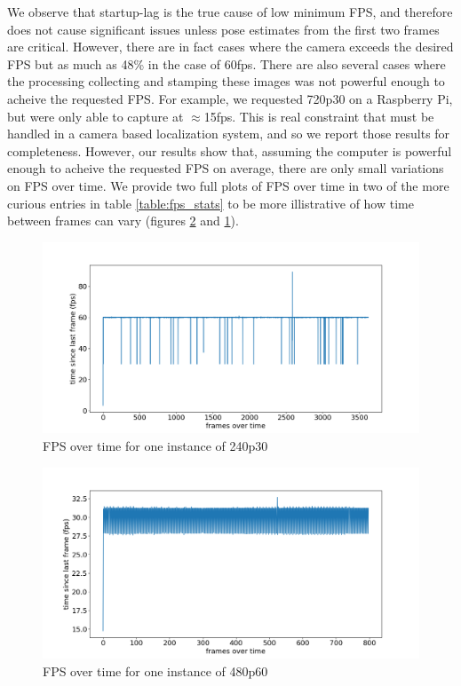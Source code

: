 \documentclass{article}
\begin{document}
    We observe that startup-lag is the true cause of low minimum FPS, and therefore does not cause significant issues unless pose estimates from the first two frames are critical. However, there are in fact cases where the camera exceeds the desired FPS but as much as 48\% in the case of 60fps. There are also several cases where the processing collecting and stamping these images was not powerful enough to acheive the requested FPS. For example, we requested 720p30 on a Raspberry Pi, but were only able to capture at $\approx$15fps. This is real constraint that must be handled in a camera based localization system, and so we report those results for completeness. However, our results show that, assuming the computer is powerful enough to acheive the requested FPS on average, there are only small variations on FPS over time. We provide two full plots of FPS over time in two of the more curious entries in table \ref{table:fps_stats} to be more illistrative of how time between frames can vary (figures \ref{fig:fps_plot_1} and \ref{fig:fps_plot_2}).

    \begin{figure}[H]
      \centering
      \includegraphics[width=0.8\linewidth]{./images/fps_plot_2.png}
      \caption{FPS over time for one instance of 240p30}
      \label{fig:fps_plot_2}
    \end{figure}

    \begin{figure}[H]
      \centering
      \includegraphics[width=0.8\linewidth]{./images/fps_plot_1.png}
      \caption{FPS over time for one instance of  480p60}
      \label{fig:fps_plot_1}
    \end{figure}
\end{document}
